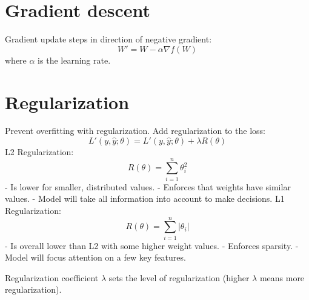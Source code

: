 \documentclass{scrartcl}
\begin{document}
\section*{Gradient descent}
Gradient update steps in direction of negative gradient:
$$W' = W - \alpha \nabla f (W)$$
where $\alpha$ is the learning rate.


\section*{Regularization}
Prevent overfitting with regularization.
Add regularization to the loss:
$$L'(y, \hat{y}; \theta) = L'(y, \hat{y}; \theta) + \lambda R(\theta)$$
L2 Regularization:
$$R(\theta) = \sum_{i=1}^{n} \theta^2_i$$
- Is lower for smaller, distributed values.
- Enforces that weights have similar values.
- Model will take all information into account to make decisions.
L1 Regularization:
$$R(\theta) = \sum_{i=1}^{n} |\theta_i|$$
- Is overall lower than L2 with some higher weight values.
- Enforces sparsity.
- Model will focus attention on a few key features.

Regularization coefficient $\lambda$ sets the level of regularization (higher $\lambda$ means more regularization).
\end{document}
